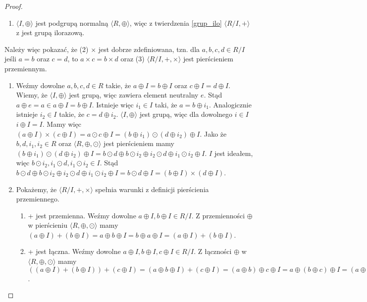 \documentclass[declaration,shortabstract]{iithesis}
\theoremstyle{definition}
\theoremstyle{remark} \newtheorem{observation}{Obserwacja}
\theoremstyle{plain} \newtheorem{theorem}{Twierdzenie}
\theoremstyle{plain} \newtheorem{lemma}{Lemat}
\theoremstyle{remark} \newtheorem*{remark*}{Uwaga}
\theoremstyle{reminder} \newtheorem*{reminder*}{Przypomnienie}
\begin{document}
\begin{proof}
	\begin{enumerate}[label=(\arabic*),leftmargin=.4in]
		\item $\langle I, \oplus \rangle$ jest podgrupą normalną $\langle R, \oplus \rangle$, więc z twierdzenia \ref{grup_ilo} $\langle R/I, + \rangle$ z jest grupą ilorazową.
	\end{enumerate}
	Należy więc pokazać, że (2) $\times$ jest dobrze zdefiniowana, tzn. dla $a, b, c, d \in R/I$ jeśli $a = b$ oraz $c = d$, to $a \times c = b \times d$ oraz (3) $\langle R/I, +, \times \rangle$ jest pierścieniem przemiennym.
	\begin{enumerate}[resume,label=(\arabic*),leftmargin=.4in]
		\item Weźmy dowolne $a, b, c, d \in R$ takie, że $a \oplus I = b \oplus I$ oraz $c \oplus I = d \oplus I$. Wiemy, że $\langle I, \oplus \rangle$ jest grupą, więc zawiera element neutralny $e$. Stąd $a \oplus e = a \in a \oplus I = b \oplus I$. Istnieje więc $i_1 \in I$ taki, że $a = b \oplus i_1$. Analogicznie istnieje $i_2 \in I$ takie, że $c = d \oplus i_2$. \newline
		      $\langle I, \oplus \rangle$ jest grupą, więc dla dowolnego $i \in I$ $i \oplus I = I$. \newline
		      Mamy więc $(a \oplus I) \times (c \oplus I) = a \odot c \oplus I = (b \oplus i_1) \odot (d \oplus i_2) \oplus I$. Jako że $b, d, i_1, i_2 \in R$ oraz $\langle R, \oplus, \odot \rangle$ jest pierścieniem mamy $(b \oplus i_1) \odot (d \oplus i_2) \oplus I = b \odot d \oplus b \odot i_2 \oplus i_2 \odot d \oplus i_1 \odot i_2 \oplus I$. $I$ jest ideałem, więc $b \odot i_2, i_1 \odot d, i_1 \odot i_2 \in I$. Stąd $b \odot d \oplus b \odot i_2 \oplus i_2 \odot d \oplus i_1 \odot i_2 \oplus I = b \odot d \oplus I = (b \oplus I) \times (d \oplus I)$.
		\item Pokażemy, że $\langle R/I, +, \times \rangle$ spełnia warunki z definicji pierścienia przemiennego.
		      \begin{enumerate}[label=(3.\arabic*)]  	    
		      	\item + jest przemienna. Weźmy dowolne $a \oplus I, b \oplus I \in R/I$. Z przemienności $\oplus$ w pierścieniu $\langle R, \oplus, \odot \rangle$ mamy $(a \oplus I) + (b \oplus I) = a \oplus b \oplus I = b \oplus a \oplus I = (a \oplus I) + (b \oplus I)$.
		      	\item + jest łączna. Weźmy dowolne $a \oplus I, b \oplus I, c \oplus I \in R/I$. Z łączności $\oplus$ w $\langle R, \oplus, \odot \rangle$ mamy $((a \oplus I) + (b \oplus I)) + (c \oplus I) = (a \oplus b \oplus I) + (c \oplus I) = (a \oplus b) \oplus c \oplus I = a \oplus (b \oplus c) \oplus I = (a \oplus I) + (b \oplus c \oplus I) = (a \oplus I) + ((b \oplus I) + (c \oplus I))$.

\end{enumerate}
\end{enumerate}
\end{proof}
\end{document}
